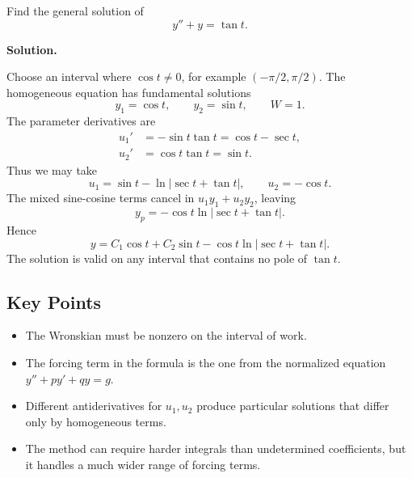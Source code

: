 \documentclass[11pt]{article}
\newenvironment{solution}
    {\par\noindent\textbf{Solution.}\par}
    {\par}
\begin{document}
Find the general solution of
\[
y''+y=\tan t.
\]

\begin{solution}
Choose an interval where \(\cos t\ne0\), for example
\((-\pi/2,\pi/2)\). The homogeneous equation has fundamental
solutions
\[
y_1=\cos t,\qquad y_2=\sin t,\qquad W=1.
\]
The parameter derivatives are
\[
\begin{aligned}
u_1'&=-\sin t\tan t=\cos t-\sec t,\\
u_2'&=\cos t\tan t=\sin t.
\end{aligned}
\]
Thus we may take
\[
u_1=\sin t-\ln|\sec t+\tan t|,
\qquad
u_2=-\cos t.
\]
The mixed sine-cosine terms cancel in \(u_1y_1+u_2y_2\), leaving
\[
y_p=-\cos t\ln|\sec t+\tan t|.
\]
Hence
\[
\boxed{y=C_1\cos t+C_2\sin t
-\cos t\ln|\sec t+\tan t|.}
\]
The solution is valid on any interval that contains no pole of
\(\tan t\).
\end{solution}

\subsection{Key Points}

\begin{itemize}
\item The Wronskian must be nonzero on the interval of work.
\item The forcing term in the formula is the one from the normalized
      equation \(y''+py'+qy=g\).
\item Different antiderivatives for \(u_1,u_2\) produce particular
      solutions that differ only by homogeneous terms.
\item The method can require harder integrals than undetermined
      coefficients, but it handles a much wider range of forcing terms.
\end{itemize}
\end{document}

